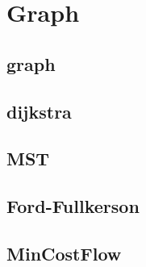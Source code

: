 \section{Graph}

\subsection{graph}


\subsection{dijkstra}


\subsection{MST}


\subsection{Ford-Fullkerson}


\subsection{MinCostFlow}
